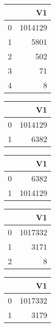 \bigskip\bigskip
\centering
\begin{tabular}{rr}
  \hline
 & V1 \\ 
  \hline
0 & 1014129 \\ 
  1 & 5801 \\ 
  2 & 502 \\ 
  3 &  71 \\ 
  4 &   8 \\ 
   \hline
\end{tabular}

\bigskip\bigskip
\centering
\begin{tabular}{rr}
  \hline
 & V1 \\ 
  \hline
0 & 1014129 \\ 
  1 & 6382 \\ 
   \hline
\end{tabular}

\bigskip\bigskip
\centering
\begin{tabular}{rr}
  \hline
 & V1 \\ 
  \hline
0 & 6382 \\ 
  1 & 1014129 \\ 
   \hline
\end{tabular}

\bigskip\bigskip
\centering
\begin{tabular}{rr}
  \hline
 & V1 \\ 
  \hline
0 & 1017332 \\ 
  1 & 3171 \\ 
  2 &   8 \\ 
   \hline
\end{tabular}

\bigskip\bigskip
\centering
\begin{tabular}{rr}
  \hline
 & V1 \\ 
  \hline
0 & 1017332 \\ 
  1 & 3179 \\ 
   \hline
\end{tabular}

